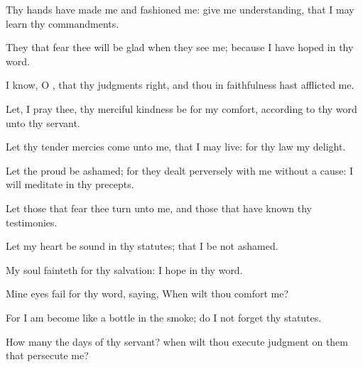 {\Q {}Thy
hands have
made me and
fashioned me: give me
understanding, that I may
learn thy
commandments.


\par }{\Q {}They that
fear thee will be
glad when they
see me; because I have
hoped in thy
word.


\par }{\Q {}I
know, O
{}, that thy
judgments
{}
right, and
{} thou in
faithfulness hast
afflicted me.


\par }{\BB \par }
{\Q {}Let, I pray thee, thy merciful
kindness be for my
comfort, according to thy
word unto thy
servant.


\par }{\Q {}Let thy tender
mercies
come unto me, that I may
live: for thy
law
{} my
delight.


\par }{\BB \par }
{\Q {}Let the
proud be
ashamed; for they dealt
perversely with me without a
cause:
{} I will
meditate in thy
precepts.


\par }{\Q {}Let those that
fear thee
turn unto me, and those that have
known thy
testimonies.


\par }{\Q {}Let my
heart be
sound in thy
statutes; that I be not
ashamed.


\par }{\BB \par }
{
\par }
{\Q {}My
soul
fainteth for thy
salvation:
{} I
hope in thy
word.


\par }{\Q {}Mine
eyes
fail for thy
word,
saying, When wilt thou
comfort me?


\par }{\Q {}For I am become like a
bottle in the
smoke;
{} do I not
forget thy
statutes.


\par }{\Q {}How many
{} the
days of thy
servant? when wilt thou
execute
judgment on them that
persecute me?


\par }{\BB \par }
